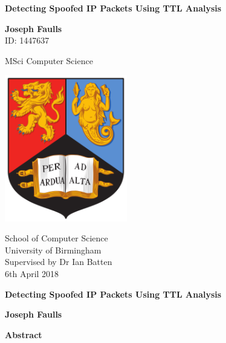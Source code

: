 \documentclass[12pt,twoside]{article}
\begin{document}
\begin{titlepage}
	\begin{center}
		\vspace*{1cm}
		
		\Huge
		\textbf{Detecting Spoofed IP Packets Using TTL Analysis}
		
		\vspace{0.5cm}
		\LARGE
		
		\vspace{1.5cm}
		
		\textbf{Joseph Faulls\\}
		\Large
		ID: 1447637
		\vfill
		
		\LARGE
		MSci Computer Science
		
		\vspace{0.8cm}
		
		\includegraphics[width=0.4\textwidth]{university_logo}
		
		\Large
		School of Computer Science\\
		University of Birmingham\\
		Supervised by Dr Ian Batten\\
		6th April 2018
		
	\end{center}
\end{titlepage}

\thispagestyle{plain}

\begin{center}
	\Large
	\textbf{Detecting Spoofed IP Packets Using TTL Analysis}
	
	\vspace{0.4cm}
	\large
	
	\vspace{0.4cm}
	\textbf{Joseph Faulls}
	
	\vspace{0.9cm}
	\textbf{Abstract}
\end{center}
\end{document}
